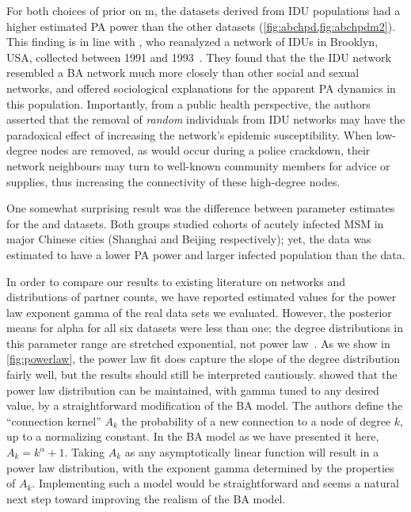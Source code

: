 For both choices of prior on \gls{m}, the datasets derived from \gls{IDU}
populations had a higher estimated \acrlong{PA} power than the other datasets
(\cref{fig:abchpd,fig:abchpdm2}). This finding is in line with
\textcite{dombrowski2013topological}, who reanalyzed a network of \glspl{IDU}
in Brooklyn, USA, collected between 1991 and
1993~\autocite{friedman2006social}. They found that the the \gls{IDU} network 
resembled a \gls{BA} network much more closely than other social and sexual 
networks, and offered sociological explanations for the apparent \acrlong{PA}
dynamics in this population. Importantly, from a public health perspective,
the authors asserted that the removal of \emph{random} individuals from
\gls{IDU} networks may have the paradoxical effect of increasing the network's
epidemic susceptibility. When low-degree nodes are removed, as would occur
during a police crackdown, their network neighbours may turn to well-known
community members for advice or supplies, thus increasing the connectivity of
these high-degree nodes.

One somewhat surprising result was the difference between parameter estimates 
for the \textcite{li2015hiv} and \textcite{wang2015targeting} datasets. Both
groups studied cohorts of acutely infected \gls{MSM} in major Chinese cities
(Shanghai and Beijing respectively); yet, the \citeauthor{li2015hiv} data was 
estimated to have a lower \acrlong{PA} power and larger infected population
than the \textcite{wang2015targeting} data. 

In order to compare our results to existing literature on networks and
distributions of partner counts, we have reported estimated values for the
power law exponent \gls{gamma} of the real data sets we evaluated. However, the
posterior means for \gls{alpha} for all six datasets were less than one; the
degree distributions in this parameter range are stretched exponential, not
power law~\autocite{krapivsky2000connectivity}. As we show in
\cref{fig:powerlaw}, the power law fit does capture the slope of the degree
distribution fairly well, but the results should still be interpreted
cautiously. \textcite{krapivsky2000connectivity} showed that the power law
distribution can be maintained, with \gls{gamma} tuned to any desired value, by
a straightforward modification of the \gls{BA} model. The authors define the
``connection kernel'' $A_k$ the probability of a new connection to a node of
degree $k$, up to a normalizing constant. In the \gls{BA} model as we have
presented it here, $A_k = k^{\alpha} + 1$. Taking $A_k$ as any asymptotically
linear function will result in a power law distribution, with the exponent
\gls{gamma} determined by the properties of $A_k$. Implementing such a model
would be straightforward and seems a natural next step toward improving the
realism of the \gls{BA} model.

